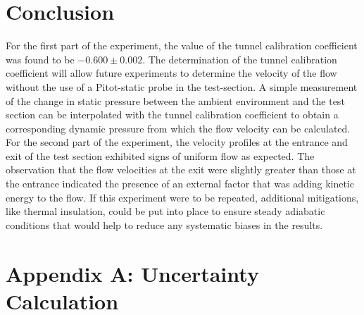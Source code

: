\documentclass[journal,letterpaper]{IEEEtran}
\begin{document}
\section{Conclusion}


For the first part of the experiment, the value of the tunnel calibration coefficient was found to be $-0.600 \pm 0.002$.
The determination of the tunnel calibration coefficient will allow future experiments to determine the velocity of the flow without the use of a Pitot-static probe in the test-section.
A simple measurement of the change in static pressure between the ambient environment and the test section can be interpolated with the tunnel calibration coefficient to obtain a corresponding dynamic pressure from which the flow velocity can be calculated.
For the second part of the experiment, the velocity profiles at the entrance and exit of the test section exhibited signs of uniform flow as expected.
The observation that the flow velocities at the exit were slightly greater than those at the entrance indicated the presence of an external factor that was adding kinetic energy to the flow.
If this experiment were to be repeated, additional mitigations, like thermal insulation, could be put into place to ensure steady adiabatic conditions that would help to reduce any systematic biases in the results.


\section*{Appendix A: Uncertainty Calculation}
\end{document}
